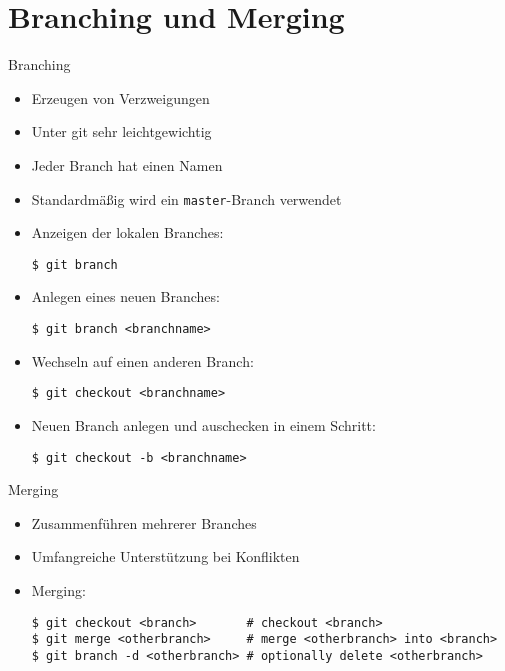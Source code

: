 \section{Branching und Merging}

\begin{frame}
  \tableofcontents[currentsection]
\end{frame}

\begin{frame}{Branching}
  \begin{itemize}
    \item Erzeugen von Verzweigungen
    \item Unter git sehr leichtgewichtig
    \item Jeder Branch hat einen Namen
    \item Standardmäßig wird ein \texttt{master}-Branch verwendet
    \framebreak

    \item Anzeigen der lokalen Branches:
    \begin{lstlisting}
$ git branch
    \end{lstlisting}
    \item Anlegen eines neuen Branches:
    \begin{lstlisting}
$ git branch <branchname>
    \end{lstlisting}
    \item Wechseln auf einen anderen Branch:
    \begin{lstlisting}
$ git checkout <branchname>
    \end{lstlisting}
    \item Neuen Branch anlegen und auschecken in einem Schritt:
    \begin{lstlisting}
$ git checkout -b <branchname>
    \end{lstlisting}

  \end{itemize}

\end{frame}

\begin{frame}[fragile]{Merging}
  \begin{itemize}
    \item Zusammenführen mehrerer Branches
    \item Umfangreiche Unterstützung bei Konflikten
    \item Merging:
    \begin{lstlisting}
$ git checkout <branch>       # checkout <branch>
$ git merge <otherbranch>     # merge <otherbranch> into <branch>
$ git branch -d <otherbranch> # optionally delete <otherbranch>
    \end{lstlisting}
  \end{itemize}
\end{frame}


